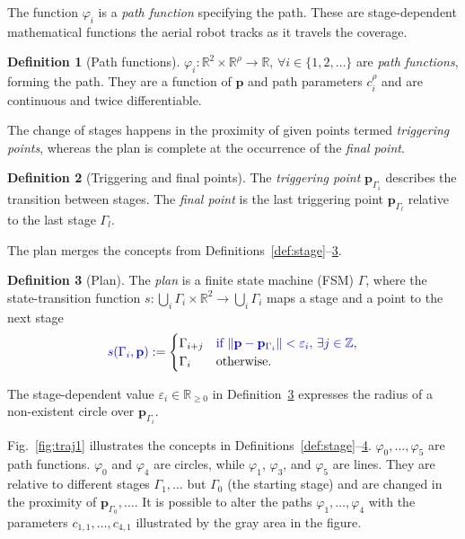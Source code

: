 \documentclass[letterpaper,10pt,journal,twoside]{IEEEtran}
\DeclarePairedDelimiter\norm{\lVert}{\rVert}%
\theoremstyle{definition}
\newtheorem{defn}{Definition}[section]
\begin{document}
The function $\varphi_i$ is a \emph{path function} specifying the path. These are stage-dependent mathematical functions the aerial robot tracks as it travels %
the coverage. 

\begin{defn}[Path functions]
  \label{def:paths}
  $\varphi_i:\mathbb{R}^2\times\mathbb{R}^\rho\rightarrow\mathbb{R},\,\forall i\in\{1,2,\dots\}
  $ are \emph{path functions}, forming the path. They are a function of {\color{blue}$\mathbf{p}%
  $} and path parameters $c_i^\rho%
  $ and are continuous and twice differentiable.
\end{defn}

The change of stages happens in the proximity of given points termed \emph{triggering points}, whereas the plan is complete at the occurrence of the \emph{final point}.

\begin{defn}[Triggering and final points]
  \label{def:trigs}
  The \emph{triggering point} $\mathbf{p}_{\Gamma_{i}}$ describes the transition between stages. The \emph{final point} is the last triggering point $\mathbf{p}_{\Gamma_{l}}$ relative to the last stage $\Gamma_l$.
\end{defn}

The plan merges the concepts from Definitions~\ref{def:stage}--\hyperref[def:trigs]{3}. %

\begin{defn}[Plan]\label{def:plan}
  The \emph{plan} is a finite state machine (FSM) $\Gamma$, where the state-transition function $s:\bigcup_i{\Gamma_i}\times\mathbb{R}^2\rightarrow\bigcup_i{\Gamma_i}$ maps a stage and a point to the next stage
  \begin{equation*}{\color{blue}s(\Gamma_i,\mathbf{p}%
    )}:=\begin{cases}
    \Gamma_{i+j} & {\color{blue}\text{if }\norm{\mathbf{p}%
    -\mathbf{p}_{\Gamma_i}}<\varepsilon_i,\,\exists j\in\mathbb{Z},}\\
    \Gamma_i & \text{otherwise}.
  \end{cases}\end{equation*}
\end{defn}

The stage-dependent value $\varepsilon_i\in\mathbb{R}_{\geq 0}$ in Definition~\ref{def:plan} expresses the radius of a non-existent circle over $\mathbf{p}_{\Gamma_i}$.

Fig.~\ref{fig:traj1} illustrates the concepts in Definitions~\ref{def:stage}--\hyperref[def:plan]{4}. $\varphi_0,\dots,\varphi_5$ are path functions. $\varphi_0$ and $\varphi_4$ are circles, while $\varphi_1$, $\varphi_3$, and $\varphi_5$ are lines. They are relative to different stages $\Gamma_1,\dots$ but $\Gamma_0$ (the starting stage) and are changed in the proximity of $\mathbf{p}_{\Gamma_0},\dots$. %
It is possible to alter the paths $\varphi_1,\dots,\varphi_4$ with the parameters $c_{1,1},\dots,c_{4,1}$ illustrated by the gray area in the figure. %
\end{document}
